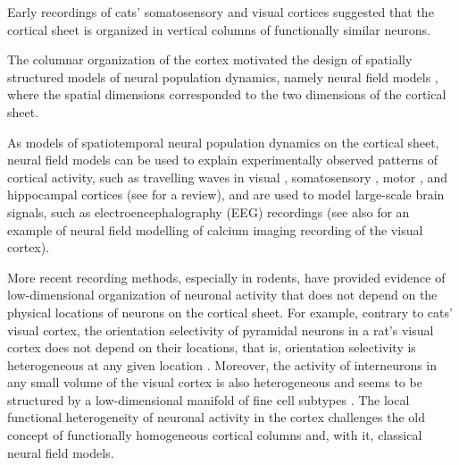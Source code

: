 \documentclass[10pt,letterpaper]{article}
\begin{document}


Early recordings of cats' somatosensory \cite{Mou57} and visual \cite{HubWie62} cortices suggested that the cortical sheet is organized in vertical columns of functionally similar neurons.

The columnar organization of the cortex motivated the design of spatially structured models of neural population dynamics, namely neural field models \cite{WilCow73,Nun74,Ama77}, where the spatial dimensions corresponded to the two dimensions of the cortical sheet. 

As models of spatiotemporal neural population dynamics on the cortical sheet, neural field models can be used to explain experimentally observed patterns of cortical activity, such as travelling waves in visual \cite{SatNau12,MulRey14}, somatosensory \cite{PetHah03,FerBol06}, motor \cite{RubRob06,TakKim15}, and hippocampal \cite{LubSia09,PatFuj12,PatSch13} cortices (see \cite{MulCha18} for a review), and are used to model large-scale brain signals, such as electroencephalography (EEG) recordings \cite{Bre17} (see also \cite{DipRan18} for an example of neural field modelling of calcium imaging recording of the visual cortex).

More recent recording methods, especially in rodents, have provided evidence of low-dimensional organization of neuronal activity that does not depend on the physical locations of neurons on the cortical sheet. For example, contrary to cats' visual cortex, the orientation selectivity of pyramidal neurons in a rat's visual cortex does not depend on their locations, that is, orientation selectivity is heterogeneous at any given location \cite{OhkChu05}. Moreover, the activity of interneurons in any small volume of the visual cortex is also heterogeneous and seems to be structured by a low-dimensional manifold of fine cell subtypes \cite{BugDuf22}. The local functional heterogeneity of neuronal activity in the cortex challenges the old concept of functionally homogeneous cortical columns and, with it, classical neural field models. 
\end{document}
